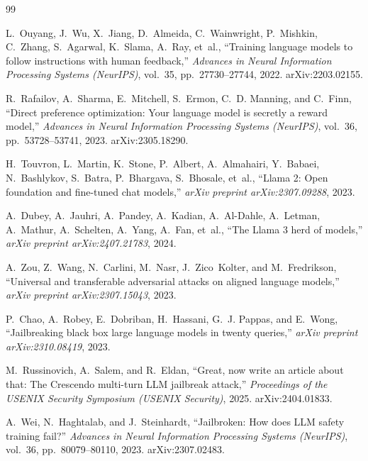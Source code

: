 \documentclass[11pt]{article}
\begin{document}
\begin{thebibliography}{99}

L.~Ouyang, J.~Wu, X.~Jiang, D.~Almeida, C.~Wainwright, P.~Mishkin, C.~Zhang, S.~Agarwal, K.~Slama, A.~Ray, et~al.,
``Training language models to follow instructions with human feedback,''
\textit{Advances in Neural Information Processing Systems (NeurIPS)}, vol.~35, pp.~27730--27744, 2022. arXiv:2203.02155.

R.~Rafailov, A.~Sharma, E.~Mitchell, S.~Ermon, C.~D. Manning, and C.~Finn,
``Direct preference optimization: Your language model is secretly a reward model,''
\textit{Advances in Neural Information Processing Systems (NeurIPS)}, vol.~36, pp.~53728--53741, 2023. arXiv:2305.18290.

H.~Touvron, L.~Martin, K.~Stone, P.~Albert, A.~Almahairi, Y.~Babaei, N.~Bashlykov, S.~Batra, P.~Bhargava, S.~Bhosale, et~al.,
``Llama 2: Open foundation and fine-tuned chat models,''
\textit{arXiv preprint arXiv:2307.09288}, 2023.

A.~Dubey, A.~Jauhri, A.~Pandey, A.~Kadian, A.~Al-Dahle, A.~Letman, A.~Mathur, A.~Schelten, A.~Yang, A.~Fan, et~al.,
``The {Llama 3} herd of models,''
\textit{arXiv preprint arXiv:2407.21783}, 2024.

A.~Zou, Z.~Wang, N.~Carlini, M.~Nasr, J.~Zico~Kolter, and M.~Fredrikson,
``Universal and transferable adversarial attacks on aligned language models,''
\textit{arXiv preprint arXiv:2307.15043}, 2023.

P.~Chao, A.~Robey, E.~Dobriban, H.~Hassani, G.~J. Pappas, and E.~Wong,
``Jailbreaking black box large language models in twenty queries,''
\textit{arXiv preprint arXiv:2310.08419}, 2023.

M.~Russinovich, A.~Salem, and R.~Eldan,
``Great, now write an article about that: The {Crescendo} multi-turn {LLM} jailbreak attack,''
\textit{Proceedings of the USENIX Security Symposium (USENIX Security)}, 2025. arXiv:2404.01833.

A.~Wei, N.~Haghtalab, and J.~Steinhardt,
``Jailbroken: How does {LLM} safety training fail?''
\textit{Advances in Neural Information Processing Systems (NeurIPS)}, vol.~36, pp.~80079--80110, 2023. arXiv:2307.02483.


\end{thebibliography}
\end{document}
